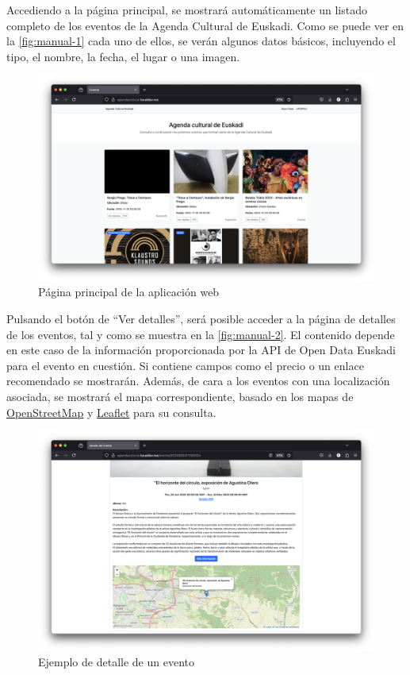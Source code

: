 \documentclass{report}
\begin{document}
        Accediendo a la página principal, se mostrará automáticamente un listado completo de los eventos de la Agenda Cultural de Euskadi. Como se puede ver en la \autoref{fig:manual-1} cada uno de ellos, se verán algunos datos básicos, incluyendo el tipo, el nombre, la fecha, el lugar o una imagen.

        \begin{figure}[H]
            \centering
            \includegraphics[width=0.9\linewidth]{img/manual-1.png}
            \caption{Página principal de la aplicación web}
            \label{fig:manual-1}
        \end{figure}

        Pulsando el botón de “Ver detalles”, será posible acceder a la página de detalles de los eventos, tal y como se muestra en la \autoref{fig:manual-2}. El contenido depende en este caso de la información proporcionada por la API de Open Data Euskadi para el evento en cuestión. Si contiene campos como el precio o un enlace recomendado se mostrarán. Además, de cara a los eventos con una localización asociada, se mostrará el mapa correspondiente, basado en los mapas de \href{https://www.openstreetmap.org}{OpenStreetMap} y \href{https://leafletjs.com}{Leaflet} para su consulta.

        \begin{figure}[H]
            \centering
            \includegraphics[width=0.9\linewidth]{img/manual-2.png}
            \caption{Ejemplo de detalle de un evento}
            \label{fig:manual-2}
        \end{figure}
\end{document}
